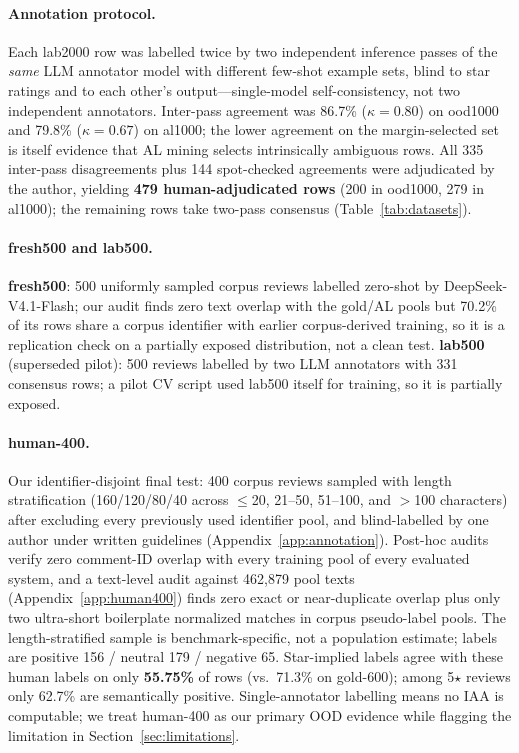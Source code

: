 \paragraph{Annotation protocol.} Each lab2000 row was labelled twice by
two independent inference passes of the \emph{same} LLM annotator model
with different few-shot example sets, blind to star ratings and to each
other's output---single-model self-consistency, not two independent
annotators. Inter-pass agreement was 86.7\% ($\kappa=0.80$) on ood1000
and 79.8\% ($\kappa=0.67$) on al1000; the lower agreement on the
margin-selected set is itself evidence that AL mining selects
intrinsically ambiguous rows. All 335 inter-pass disagreements plus 144
spot-checked agreements were adjudicated by the author, yielding
\textbf{479 human-adjudicated rows} (200 in ood1000, 279 in al1000);
the remaining rows take two-pass consensus (Table~\ref{tab:datasets}).

\paragraph{fresh500 and lab500.} \textbf{fresh500}: 500 uniformly
sampled corpus reviews labelled zero-shot by DeepSeek-V4.1-Flash; our
audit finds zero text overlap with the gold/AL pools but 70.2\% of its
rows share a corpus identifier with earlier corpus-derived training,
so it is a replication check on a partially exposed distribution, not
a clean test. \textbf{lab500} (superseded pilot): 500 reviews labelled
by two LLM annotators with 331 consensus rows; a pilot CV script used
lab500 itself for training, so it is partially exposed.

\paragraph{human-400.} Our identifier-disjoint final test: 400 corpus
reviews sampled with length stratification (160/120/80/40 across
$\le$20, 21--50, 51--100, and $>$100 characters) after excluding
every previously used identifier pool, and blind-labelled by one
author under written guidelines (Appendix~\ref{app:annotation}).
Post-hoc audits verify zero comment-ID overlap with every training
pool of every evaluated system, and a text-level audit against
462{,}879 pool texts (Appendix~\ref{app:human400}) finds zero exact
or near-duplicate overlap plus only two ultra-short boilerplate
normalized matches in corpus pseudo-label pools. The
length-stratified sample is benchmark-specific, not a population
estimate; labels are positive 156 / neutral 179 / negative 65.
Star-implied labels agree with these human labels on only
\textbf{55.75\%} of rows (vs.\ 71.3\% on gold-600); among 5$\star$
reviews only 62.7\% are semantically positive. Single-annotator
labelling means no IAA is computable; we treat human-400 as our
primary OOD evidence while flagging the limitation in
Section~\ref{sec:limitations}.

